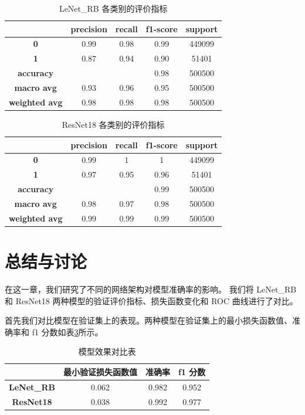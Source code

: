 \documentclass[supercite]{Experimental_Report}
\theoremstyle{definition}
\begin{document}
\begin{table}[H]
	\centering
	\caption{LeNet\_RB 各类别的评价指标}
	  \begin{tabular}{ccccc}
		\toprule
			& \textbf{precision} & \textbf{recall} & \textbf{f1-score} & \textbf{support} \\\hline
	  \textbf{0} & 0.99  & 0.98  & 0.99  & 449099 \\
	  \textbf{1} & 0.87  & 0.94     & 0.90  & 51401 \\
	  \textbf{accuracy} &       &       & 0.98  & 500500 \\
	  \textbf{macro avg} & 0.93  & 0.96  & 0.95  & 500500 \\
	  \textbf{weighted avg} & 0.98  & 0.98  & 0.98  & 500500 \\\bottomrule
	  \end{tabular}
	\label{LeNetRB各类别评价指标}
  \end{table}
  \begin{table}[H]
	\centering
	\caption{ResNet18 各类别的评价指标}
	  \begin{tabular}{ccccc}
		\toprule
			& \textbf{precision} & \textbf{recall} & \textbf{f1-score} & \textbf{support} \\\hline
	  \textbf{0} & 0.99  & 1  & 1  & 449099 \\
	  \textbf{1} & 0.97  & 0.95     & 0.96  & 51401 \\
	  \textbf{accuracy} &       &       & 0.99  & 500500 \\
	  \textbf{macro avg} & 0.98  & 0.97  & 0.98  & 500500 \\
	  \textbf{weighted avg} & 0.99  & 0.99  & 0.99  & 500500 \\\bottomrule
	  \end{tabular}
	\label{ResNet18各类别评价指标}
  \end{table}

\section{总结与讨论}
在这一章，我们研究了不同的网络架构对模型准确率的影响。
我们将 LeNet\_RB 和 ResNet18 两种模型的验证评价指标、损失函数变化和 ROC 曲线进行了对比。

首先我们对比模型在验证集上的表现。两种模型在验证集上的最小损失函数值、准确率和 f1 分数如表\ref{模型对比表}所示。
\begin{table}[H]
	\centering
	\caption{模型效果对比表}
	  \begin{tabular}{cccc}
		\toprule
			& \textbf{最小验证损失函数值} & \textbf{准确率} & \textbf{f1 分数} \\\hline
	  \textbf{LeNet\_RB} & 0.062 & 0.982 & 0.952 \\
	  \textbf{ResNet18} & 0.038 & 0.992 & 0.977 \\
	  \bottomrule
	  \end{tabular}
	\label{模型对比表}
  \end{table}
\end{document}

